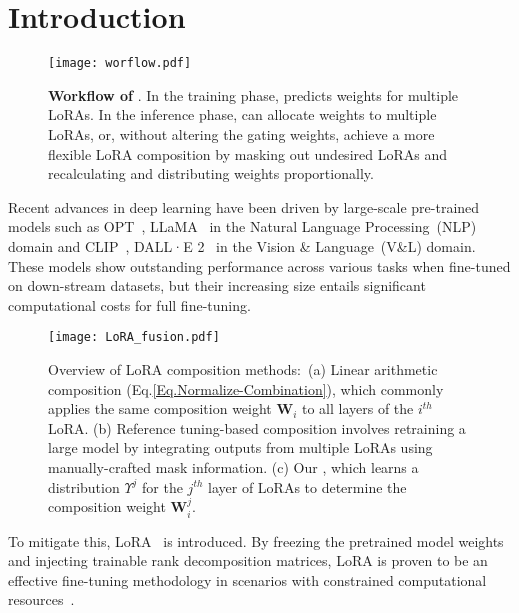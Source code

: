 \section{Introduction}
\begin{wrapfigure}{R}{0.45\textwidth}
\vspace{-8mm}
\centering
\texttt{[image: worflow.pdf]}
\vspace{-6mm}
\caption{\textbf{Workflow of \our{}}. In the training phase, \our{} predicts weights for multiple LoRAs. In the inference phase, \our{} can allocate weights to multiple LoRAs, or, without altering the gating weights, achieve a more flexible LoRA composition by masking out undesired LoRAs and recalculating and distributing weights proportionally.}
\label{fig:workflow}
\vspace{-5mm}
\end{wrapfigure}
Recent advances in deep learning have been driven by large-scale pre-trained models such as OPT~\citep{opt}, LLaMA~\citep{llama} in the Natural Language Processing~(NLP) domain and CLIP~\citep{clip}, DALL·E 2~\citep{dell2} in the Vision \& Language~(V\&L) domain.
These models show outstanding performance across various tasks when fine-tuned on down-stream datasets, but their increasing size entails significant computational costs for full fine-tuning.
\begin{figure*}[t]
\centering
\texttt{[image: LoRA\_fusion.pdf]}
\\
\vspace{-2mm}
\caption{Overview of LoRA composition methods:~(a) Linear arithmetic composition (Eq.\ref{Eq.Normalize-Combination}), which commonly applies the same composition weight $\boldsymbol{W}_i$ to all layers of the $i^{th}$ LoRA. (b) Reference tuning-based composition involves retraining a large model by integrating outputs from multiple LoRAs using manually-crafted mask information. (c) Our \our, which learns a distribution $\Upsilon^{j}$ for the $j^{th}$ layer of LoRAs to determine the composition weight $\boldsymbol{W}^{j}_i$.}
\label{fig:main_motivation}
\vspace{-3mm}
\end{figure*}
To mitigate this, LoRA~\citep{lora} is introduced.
By freezing the pretrained model weights and injecting trainable rank decomposition matrices, LoRA is proven to be an effective fine-tuning methodology in scenarios with constrained computational resources~\citep{lester2021power,an2022input}.

